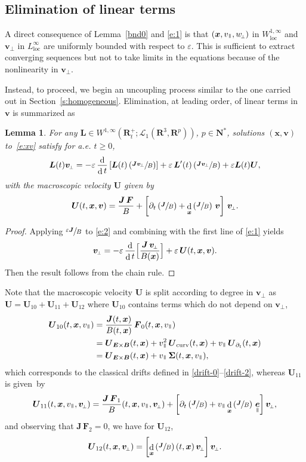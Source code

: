 \documentclass[JEP,XML,SOM,Unicode]{cedram}
\let\mathcal\mathscr
\newcommand{\sperp}{{\scriptscriptstyle\perp}}
\let\eps\varepsilon
\let\d\partial
\DeclareMathOperator\dD{d}\let\dd\dD
\theoremstyle{plain}
\newtheorem{lemma}[theorem]{Lemma}
\theoremstyle{definition}
\newcommand{\be}{\begin{equation}}
\newcommand{\ee}{\end{equation}}
\newcommand{\bl}{\begin{lemma}}
\newcommand{\el}{\end{lemma}}
\newcommand\R{\mathbf R}
\newcommand{\N}{\mathbf N}
\newcommand\bB{{\boldsymbol B}}
\newcommand\bE{{\boldsymbol E}}
\newcommand\bF{{\boldsymbol F}}
\newcommand\bJ{{\boldsymbol J}}
\newcommand\bL{{\boldsymbol L}}
\newcommand\bU{{\boldsymbol U}}
\newcommand\bfv{{\boldsymbol v}}
\newcommand\bfx{{\boldsymbol x}}
\newcommand\Sig{{\boldsymbol \Sigma}}
\newcommand\cL{{\mathcal L}}
\DeclareMathOperator{\beD}{\boldsymbol{e}}
\newcommand\eDpar{\beD_\mypar}
\newcommand\vpar{v_\mypar}
\newcommand\bvperp{\bfv_{\!\sperp}}
\newcommand\eperp{w_{\!\sperp}}
\newcommand{\EcB}{\bU_{\bE\times\bB}}
\newcommand{\curvB}{\bU_{\mathrm{curv}}}
\newcommand{\dtB}{\bU_{\d_t}}
\newcommand{\mypar}{{\mkern3mu\vphantom{\perp}\vrule depth 0pt\mkern2mu\vrule depth 0pt\mkern3mu}}
\begin{document}
\subsection{Elimination of linear terms}

A direct consequence of Lemma~\ref{bnd0} and \eqref{e:1} is that $(\bfx,\vpar,\eperp)$ in $W^{1,\infty}_\mathrm{loc}$ and $\bvperp$ in $L_\mathrm{loc}^\infty$ are uniformly bounded with respect to $\eps$. This is sufficient to extract converging sequences but not to take limits in the equations because of the nonlinearity in $\bvperp$.

Instead, to proceed, we begin an uncoupling process similar to the one carried out in Section~\ref{s:homogeneous}. Elimination, at leading order, of linear terms in $\bfv$ is summarized as

\bl
\label{1st}
For any $\bL\in W^{1,\infty}(\R^+_t;\cL_1(\R^3,\R^p))$, $p\in\N^*$,
solutions $(\bfx,\bfv)$ to~\eqref{e:xv} satisfy for a.e. $t\geq 0$,
\[
\bL(t)\bvperp =-\eps\,\frac{\dD}{\dD t}\left[\bL(t)\left(\sfrac{\bJ\bvperp}{B}\right)\right]
+\eps\, \bL'(t)\left(\sfrac{\bJ\bvperp}{B}\right)
+\eps \bL(t)\bU,
\]
with the macroscopic velocity $\bU$ given by
\be
\label{U}
\bU(t,\bfx,\bfv)= \frac{\bJ\,\bF}{B}
+\left[\d_t\left(\sfrac{\bJ}{B}\right)
+\dD_\bfx\left(\sfrac{\bJ}{B}\right)\,\bfv\right]\,\bvperp.
\ee
\el

\begin{proof}
Applying $\sfrac{\eps\bJ}{B}$ to \eqref{e:2} and combining with the first line of \eqref{e:1} yields
\be\label{e:homologic-1st}
\bvperp =-\eps\,\frac{\dD}{\dD t}\Bigl[\frac{\bJ\,\bvperp}{B(\bfx)}\Bigr]
+\eps\, \bU(t,\bfx,\bfv).
\ee
Then the result follows from the chain rule.
\end{proof}

Note that the macroscopic velocity $\bU$ is split according to degree
in $\bvperp$ as $\bU=\bU_{10}+\bU_{11}+\bU_{12}$ where $\bU_{10}$
contains terms which do not depend on $\bvperp$,
\begin{align*}
\bU_{10}(t,\bfx,\vpar) &=
\frac{\bJ(t,\bfx)}{B(t,\bfx)}\,\bF_{0}(t,\bfx,\vpar)
\\
&= \EcB(t,\bfx)+\vpar^2\,\curvB(t,\bfx) +\vpar\,\dtB(t,\bfx)
\\
&= \EcB(t,\bfx)+\vpar\,\Sig(t,\bfx,\vpar),
\end{align*}
which corresponds to the classical drifts defined in \eqref{drift-0}--\eqref{drift-2}, whereas $\bU_{11}$ is given~by
\[
\bU_{11}(t,\bfx,\vpar,\bvperp)
= \frac{\bJ\,\bF_1}{B}(t,\bfx,\vpar,\bvperp)
+\left[\d_t\left(\sfrac{\bJ}{B}\right) +\vpar\dD_\bfx\left(\sfrac{\bJ}{B}\right)\,\eDpar\right]\bvperp,
\]
and observing that $\bJ\,\bF_2=0$, we have for $\bU_{12}$,
\[
\bU_{12}(t,\bfx,\bvperp)
=\left[\dD_\bfx\left(\sfrac{\bJ}{B}\right)(t,\bfx)\,\bvperp\right]\bvperp.
\]
\end{document}
